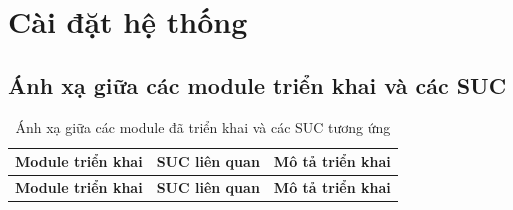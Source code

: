 \section{Cài đặt hệ thống}
\label{sec:implementation}

\subsection{Ánh xạ giữa các module triển khai và các SUC}

\begingroup
\small
\setlength{\LTleft}{0pt}
\setlength{\LTright}{0pt}
\begin{longtable}{|p{4.0cm}|p{2.9cm}|p{8.1cm}|}
\caption{Ánh xạ giữa các module đã triển khai và các SUC tương ứng}\label{tab:implementation-suc-mapping}\\
\hline
\textbf{Module triển khai} & \textbf{SUC liên quan} & \textbf{Mô tả triển khai} \\
\hline
\endfirsthead

\hline
\textbf{Module triển khai} & \textbf{SUC liên quan} & \textbf{Mô tả triển khai} \\
\hline
\endhead


\end{longtable}
